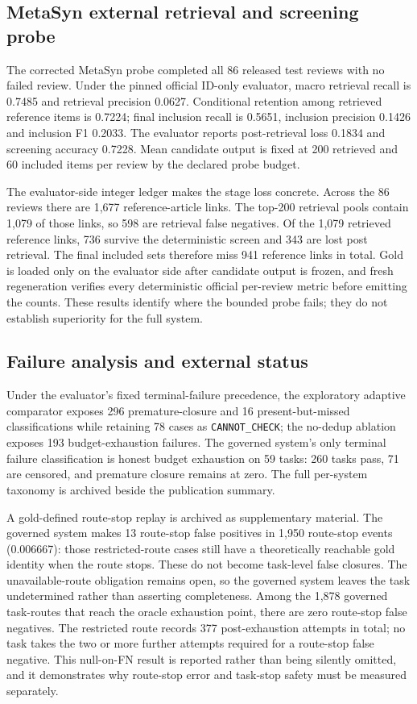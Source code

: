 \subsection{MetaSyn external retrieval and screening probe}
The corrected MetaSyn probe completed all 86 released test reviews with no
failed review.  Under the pinned official ID-only evaluator, macro retrieval
recall is 0.7485 and retrieval precision 0.0627.  Conditional retention among
retrieved reference items is 0.7224; final inclusion recall is 0.5651,
inclusion precision 0.1426 and inclusion F1 0.2033.  The evaluator reports
post-retrieval loss 0.1834 and screening accuracy 0.7228.  Mean candidate output
is fixed at 200 retrieved and 60 included items per review by the declared
probe budget.

The evaluator-side integer ledger makes the stage loss concrete.  Across the 86
reviews there are 1,677 reference-article links.  The top-200 retrieval pools
contain 1,079 of those links, so 598 are retrieval false negatives.  Of the
1,079 retrieved reference links, 736 survive the deterministic screen and 343
are lost post retrieval.  The final included sets therefore miss 941 reference
links in total.  Gold is loaded only on the evaluator side after candidate
output is frozen, and fresh regeneration verifies every deterministic official
per-review metric before emitting the counts.  These results identify where the
bounded probe fails; they do not establish superiority for the full system.

\subsection{Failure analysis and external status}
Under the evaluator's fixed terminal-failure precedence, the exploratory
adaptive comparator exposes 296 premature-closure and 16 present-but-missed
classifications while retaining 78 cases as \texttt{CANNOT\_CHECK}; the no-dedup ablation
exposes 193 budget-exhaustion failures.  The governed system's only terminal
failure classification is honest budget exhaustion on 59 tasks: 260 tasks pass,
71 are censored, and premature closure remains at zero.
The full per-system taxonomy is archived beside the publication summary.

A gold-defined route-stop replay is archived as supplementary material.
The governed system makes 13 route-stop false positives in 1,950 route-stop events
(0.006667): those restricted-route cases still have a theoretically reachable
gold identity when the route stops.  These do not become
task-level false closures.  The unavailable-route obligation remains open, so
the governed system leaves the task undetermined rather than asserting completeness.
Among the 1,878 governed task-routes that reach the oracle exhaustion point, there
are zero route-stop false negatives.  The restricted route records 377
post-exhaustion attempts in total; no task takes the two or more further
attempts required for a route-stop false negative.  This null-on-FN result is reported rather than being
silently omitted, and it demonstrates why route-stop error and task-stop safety
must be measured separately.

